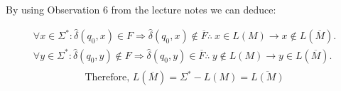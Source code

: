 
By using Observation 6 from the lecture notes we can deduce:

\begin{align*}
\forall x \in \Sigma^* : \hat \delta (q_0,x) \in F \Rightarrow \hat \delta(q_0, x) \notin \overline F \therefore \ x \in L(M) \rightarrow x \notin L(\overline M). \\
\forall y \in \Sigma^* : \hat \delta (q_0, y) \notin  F \Rightarrow \hat \delta(q_0, y) \in \overline F \therefore \ y \notin L(M) \rightarrow y \in L(\overline M). \\
\end{align*}
$$
\text{Therefore, } L(\overline M) = \Sigma^* - L(M) = \overline{L(M)}
$$